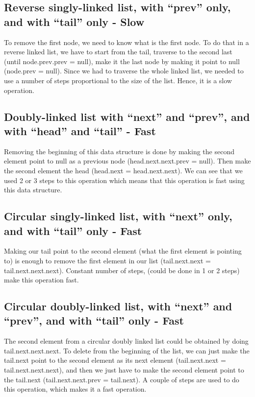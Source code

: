 \documentclass{article}
\begin{document}
\subsection{Reverse singly-linked list, with “prev” only, and with “tail” only - Slow}
To remove the first node, we need to know what is the first node. To do that in a reverse linked list, we have to start from the tail, traverse to the second last (until node.prev.prev = null), make it the last node by making it point to null (node.prev = null). Since we had to traverse the whole linked list, we needed to use a number of steps proportional to the size of the list. Hence, it is a slow operation.

\subsection{Doubly-linked list with “next” and “prev”, and with “head” and “tail” - Fast}
Removing the beginning of this data structure is done by making the second element point to null as a previous node (head.next.next.prev = null). Then make the second element the head (head.next = head.next.next). We can see that we used 2 or 3 steps to this operation which means that this operation is fast using this data structure.

\subsection{Circular singly-linked list, with “next” only, and with “tail” only - Fast}
Making our tail point to the second element (what the first element is pointing to) is enough to remove the first element in our list (tail.next.next = tail.next.next.next). Constant number of steps, (could be done in 1 or 2 steps) make this operation fast. 

\subsection{Circular doubly-linked list, with “next” and “prev”, and with “tail” only - Fast}
The second element from a circular doubly linked list could be obtained by doing tail.next.next.next. To delete from the beginning of the list, we can just make the tail.next point to the second element as its next element (tail.next.next = tail.next.next.next), and then we just have to make the second element point to the tail.next (tail.next.next.prev = tail.next). A couple of steps are used to do this operation, which makes it a fast operation.
\end{document}
